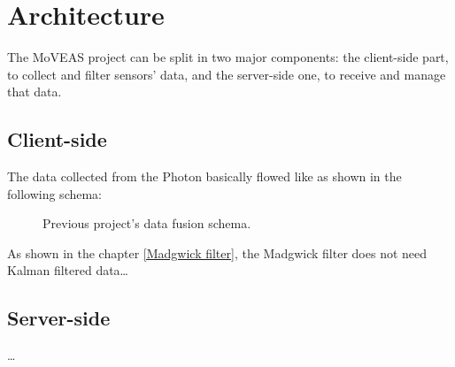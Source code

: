 \chapter{Architecture}
The MoVEAS project can be split in two major components: the client-side part, to collect and filter sensors' data, and the server-side one, to receive and manage that data.

\section{Client-side}
The data collected from the Photon basically flowed like as shown in the following schema:

\begin{center}
	\begin{figure}[ht!]
		\caption{Previous project's data fusion schema.} \label{old data fusion schema}
	\end{figure}
\end{center}
\bigbreak

As shown in the chapter \ref{Madgwick filter}, the Madgwick filter does not need Kalman filtered data\dots

\section{Server-side}
\dots
